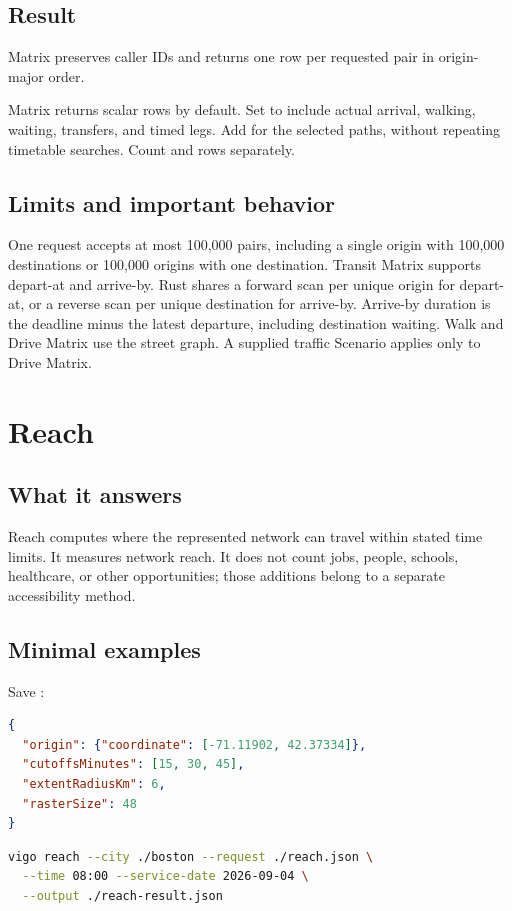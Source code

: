 \documentclass[10pt,letterpaper]{article}
\begin{document}
\subsection{Result}

Matrix preserves caller IDs and returns one row per requested pair in origin-major order.

Matrix returns scalar rows by default. Set  to include actual arrival, walking, waiting, transfers, and timed legs. Add  for the selected paths, without repeating timetable searches. Count  and  rows separately.

\subsection{Limits and important behavior}

One request accepts at most 100,000 pairs, including a single origin with 100,000 destinations or 100,000 origins with one destination. Transit Matrix supports depart-at and arrive-by. Rust shares a forward scan per unique origin for depart-at, or a reverse scan per unique destination for arrive-by. Arrive-by duration is the deadline minus the latest departure, including destination waiting. Walk and Drive Matrix use the street graph. A supplied traffic Scenario applies only to Drive Matrix.

\section{Reach}

\subsection{What it answers}

Reach computes where the represented network can travel within stated time limits. It measures network reach. It does not count jobs, people, schools, healthcare, or other opportunities; those additions belong to a separate accessibility method.

\noindent\begin{minipage}{\linewidth}
\subsection{Minimal examples}

Save :

\begin{lstlisting}[language=json]
{
  "origin": {"coordinate": [-71.11902, 42.37334]},
  "cutoffsMinutes": [15, 30, 45],
  "extentRadiusKm": 6,
  "rasterSize": 48
}
\end{lstlisting}

\begin{lstlisting}[language=bash]
vigo reach --city ./boston --request ./reach.json \
  --time 08:00 --service-date 2026-09-04 \
  --output ./reach-result.json
\end{lstlisting}

\end{minipage}
\end{document}

